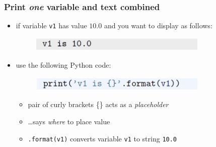 \documentclass[14pt]{beamer}
\newcommand\red[1]{{\color{red} #1}}
\begin{document}
\begin{frame}[fragile]

\frametitle{Print \emph{one} variable and text combined}

\begin{itemize}
\item if variable \texttt{v1} has value $10.0$ and you want to display as follows:

\begin{figure}[ht]
	\centering
	\includegraphics[width=0.8\textwidth]{figures/LLp28a}
\end{figure}

\item use the following Python code:
\begin{figure}[ht]
	\centering
	\includegraphics[width=0.8\textwidth]{figures/LLp28b}
\end{figure}
	\begin{itemize}
		\item pair of curly brackets \{\} acts as a \red{\emph{placeholder}}
		\item \ldots says \emph{where} to place value
		\item \texttt{.format(v1)} converts variable \texttt{v1} to string \texttt{10.0}
	\end{itemize}
\end{itemize}

\end{frame}

\end{document}
